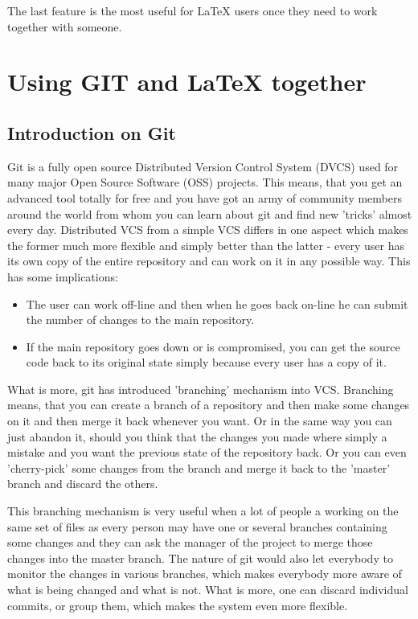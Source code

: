 \documentclass[
]{scrartcl}
\begin{document}
%
The last feature is the most useful for \LaTeX{} users once they need to work
    together with someone.

\section{Using GIT and \LaTeX{} together}

%
\subsection{Introduction on Git}

%
Git is a fully open source Distributed Version Control System (DVCS) used for
    many major Open Source Software (OSS) projects.
%
This means, that you get an advanced tool totally for free and you have got an
    army of community members around the world from whom you can learn about git
    and find new 'tricks' almost every day.
%
Distributed VCS from a simple VCS differs in one aspect which makes the former
    much more flexible and simply better than the latter - every user has its
    own copy of the entire repository and can work on it in any possible way.
%
This has some implications:
\begin{itemize}
    \item The user can work off-line and then when he goes back on-line he can
        submit the number of changes to the main repository.
    \item If the main repository goes down or is compromised, you can get the
        source code back to its original state simply because every user has a
        copy of it.
\end{itemize}


%
What is more, git has introduced 'branching' mechanism into VCS.
%
Branching means, that you can create a branch of a repository and then make some
    changes on it and then merge it back whenever you want.
%
Or in the same way you can just abandon it, should you think that the changes you
    made where simply a mistake and you want the previous state of the
    repository back.
%
Or you can even 'cherry-pick' some changes from the branch and merge it back to
    the 'master' branch and discard the others.

%
This branching mechanism is very useful when a lot of people a working on the
    same set of files as every person may have one or several branches
    containing some changes and they can ask the manager of the project to merge
    those changes into the master branch.
%
The nature of git would also let everybody to monitor the changes in various
    branches, which makes everybody more aware of what is being changed and what
    is not.
%
What is more, one can discard individual commits, or group them, which makes the
    system even more flexible.
\end{document}
